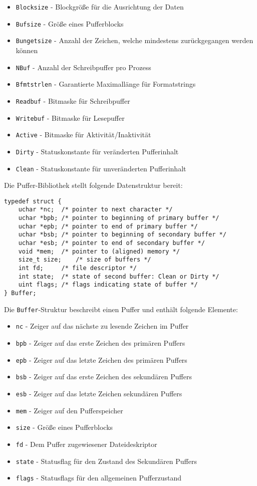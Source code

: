 \begin{itemize}
\item \texttt{Blocksize} - Blockgröße für die Ausrichtung der Daten
\item \texttt{Bufsize} - Größe eines Pufferblocks
\item \texttt{Bungetsize} - Anzahl der Zeichen, welche mindestens zurückgegangen werden können
\item \texttt{NBuf} - Anzahl der Schreibpuffer pro Prozess
\item \texttt{Bfmtstrlen} - Garantierte Maximallänge für Formatstrings
\item \texttt{Readbuf} - Bitmaske für Schreibpuffer
\item \texttt{Writebuf} - Bitmaske für Lesepuffer
\item \texttt{Active} - Bitmaske für Aktivität/Inaktivität
\item \texttt{Dirty} - Statuskonstante für veränderten Pufferinhalt
\item \texttt{Clean} - Statuskonstante für unveränderten Pufferinhalt
\end{itemize}

Die Puffer-Bibliothek stellt folgende Datenstruktur bereit:
\begin{lstlisting}
typedef struct {
	uchar *nc;	/* pointer to next character */
	uchar *bpb;	/* pointer to beginning of primary buffer */
	uchar *epb;	/* pointer to end of primary buffer */
	uchar *bsb;	/* pointer to beginning of secondary buffer */
	uchar *esb;	/* pointer to end of secondary buffer */
	void *mem;	/* pointer to (aligned) memory */
	size_t size;	/* size of buffers */
	int fd;		/* file descriptor */
	int state;	/* state of second buffer: Clean or Dirty */
	uint flags;	/* flags indicating state of buffer */
} Buffer;
\end{lstlisting}

Die \texttt{Buffer}-Struktur beschreibt einen Puffer und enthält folgende Elemente:

\begin{itemize}
\item \texttt{nc} - Zeiger auf das nächste zu lesende Zeichen im Puffer
\item \texttt{bpb} - Zeiger auf das erste Zeichen des primären Puffers
\item \texttt{epb} - Zeiger auf das letzte Zeichen des primären Puffers
\item \texttt{bsb} - Zeiger auf das erste Zeichen des sekundären Puffers
\item \texttt{esb} - Zeiger auf das letzte Zeichen sekundären Puffers
\item \texttt{mem} - Zeiger auf den Pufferspeicher
\item \texttt{size} - Größe eines Pufferblocks
\item \texttt{fd} - Dem Puffer zugewiesener Dateideskriptor
\item \texttt{state} - Statusflag für den Zustand des Sekundären Puffers
\item \texttt{flags} - Statusflags für den allgemeinen Pufferzustand
\end{itemize}

